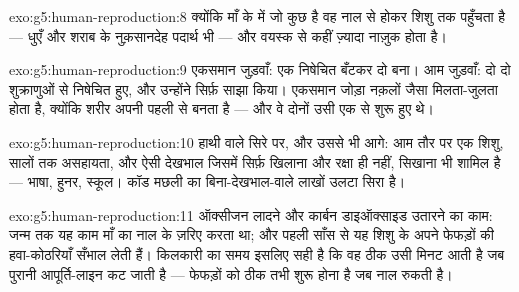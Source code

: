 \begin{solution}{exo:g5:human-reproduction:8}
क्योंकि माँ के  में जो कुछ है वह नाल से होकर शिशु तक पहुँचता है ---
धुएँ और शराब के नुक़सानदेह पदार्थ भी --- और  वयस्क से कहीं
ज़्यादा नाज़ुक होता है।
\end{solution}

\begin{solution}{exo:g5:human-reproduction:9}
एकसमान जुड़वाँ: एक निषेचित  बँटकर दो  बना। आम जुड़वाँ: दो
 दो शुक्राणुओं से निषेचित हुए, और उन्होंने सिर्फ़  साझा
किया। एकसमान जोड़ा नक़लों जैसा मिलता-जुलता होता है, क्योंकि शरीर अपनी
पहली  से बनता है --- और वे दोनों उसी एक  से शुरू हुए थे।
\end{solution}

\begin{solution}{exo:g5:human-reproduction:10}
हाथी वाले सिरे पर, और उससे भी आगे: आम तौर पर एक शिशु, सालों तक
असहायता, और ऐसी देखभाल जिसमें सिर्फ़ खिलाना और रक्षा ही नहीं, सिखाना
भी शामिल है --- भाषा, हुनर, स्कूल। कॉड मछली का बिना-देखभाल-वाले लाखों
 उलटा सिरा है।
\end{solution}

\begin{solution}{exo:g5:human-reproduction:11}
ऑक्सीजन लादने और कार्बन डाइऑक्साइड उतारने का काम: जन्म तक यह काम माँ का
 नाल के ज़रिए करता था; और पहली साँस से यह शिशु के अपने फेफड़ों की
हवा-कोठरियाँ सँभाल लेती हैं। किलकारी का समय इसलिए सही है कि वह ठीक उसी
मिनट आती है जब पुरानी आपूर्ति-लाइन कट जाती है --- फेफड़ों को ठीक तभी
शुरू होना है जब नाल रुकती है।
\end{solution}
